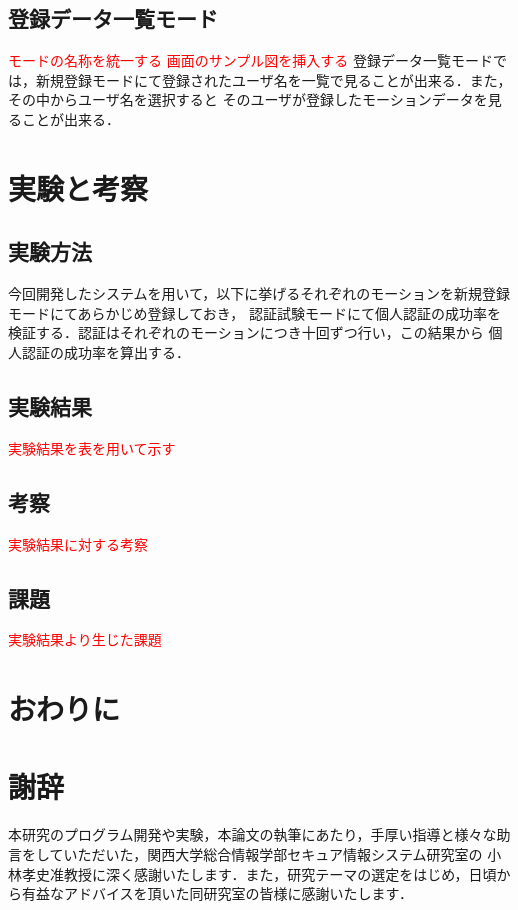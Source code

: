 \documentclass[11pt]{jreport}
\begin{document}
	\section{登録データ一覧モード}
    \textcolor{red}{モードの名称を統一する}
    \textcolor{red}{画面のサンプル図を挿入する}
	登録データ一覧モードでは，新規登録モードにて登録されたユーザ名を一覧で見ることが出来る．また，その中からユーザ名を選択すると
    そのユーザが登録したモーションデータを見ることが出来る．
\chapter{実験と考察}
	\section{実験方法}
	今回開発したシステムを用いて，以下に挙げるそれぞれのモーションを新規登録モードにてあらかじめ登録しておき，
    認証試験モードにて個人認証の成功率を検証する．認証はそれぞれのモーションにつき十回ずつ行い，この結果から
    個人認証の成功率を算出する．
	\section{実験結果}
	\textcolor{red}{実験結果を表を用いて示す}
	\section{考察}
    \textcolor{red}{実験結果に対する考察}
	\section{課題}
	\textcolor{red}{実験結果より生じた課題}
\chapter{おわりに}


\chapter*{謝辞}
本研究のプログラム開発や実験，本論文の執筆にあたり，手厚い指導と様々な助言をしていただいた，関西大学総合情報学部セキュア情報システム研究室の
小林孝史准教授に深く感謝いたします．また，研究テーマの選定をはじめ，日頃から有益なアドバイスを頂いた同研究室の皆様に感謝いたします．
\end{document}

